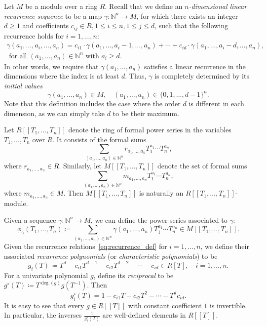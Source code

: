 \documentclass[letterpaper, 11pt, thm-restate]{article}
\numberwithin{equation}{section}
\newcommand{\N}{\mathbb{N}}
\theoremstyle{definition}
\theoremstyle{definition}
\theoremstyle{definition}
\begin{document}
Let $M$ be a module over a ring $R$.
Recall that we define an \emph{$n$-dimensional linear recurrence sequence} to be a map $\gamma \colon \N^n \rightarrow M$, for which there exists an integer $d \geq 1$ and coefficients $c_{ij} \in R, 1 \leq i \leq n, 1 \leq j \leq d$, such that the following recurrence holds for $i = 1, \ldots, n$:
\begin{align}\label{eq:recurrence_def}
\gamma(a_1, \ldots, a_i, \ldots, a_n) = c_{i1} \cdot \gamma(a_1, \ldots, a_i-1, \ldots, a_n) + \cdots + c_{id} \cdot \gamma(a_1, \ldots, a_i-d, \ldots, a_n), \quad & \\
\text{ for all $(a_1, \ldots, a_n) \in \N^n$ with $a_i\geq d$}.& \nonumber
\end{align}
In other words, we require that $\gamma(a_1, \ldots, a_n)$ satisfies a linear recurrence in the dimensions where the index is at least $d$.
Thus, $\gamma$ is completely determined by its \emph{initial values}
\[
\gamma(a_1, \ldots, a_n) \in M, \quad (a_1, \ldots, a_n) \in \{0, 1, \ldots, d-1\}^n.
\]
Note that this definition includes the case where the order $d$ is different in each dimension, as we can simply take $d$ to be their maximum.

Let $R[[T_1,\ldots,T_n]]$ denote the ring of formal power series in the variables $T_1, \ldots, T_n$ over $R$.
It consists of the formal sums
\[
\sum_{(a_1, \ldots, a_n) \in \N^n} r_{a_1, \ldots, a_n} T_1^{a_1} \cdots T_n^{a_n},
\]
where $r_{a_1, \ldots, a_n} \in R$.
Similarly, let $M[[T_1,\ldots,T_n]]$ denote the set of formal sums
\[
\sum_{(a_1, \ldots, a_n) \in \N^n} m_{a_1, \ldots, a_n} T_1^{a_1} \cdots T_n^{a_n},
\]
where $m_{a_1, \ldots, a_n} \in M$. 
Then $M[[T_1,\ldots,T_n]]$ is naturally an $R[[T_1,\ldots,T_n]]$-module.

Given a sequence $\gamma \colon \N^n \rightarrow M$, we can define the power series associated to $\gamma$:
\[
\phi_{\gamma}(T_1, \ldots, T_n) \coloneqq \sum_{(a_1, \ldots, a_n) \in \N^n} \gamma(a_1, \ldots, a_n) T_1^{a_1} \cdots T_n^{a_n} \in M[[T_1, \ldots, T_n]].
\]
Given the recurrence relations~\eqref{eq:recurrence_def} for $i = 1, \ldots, n$, we define their associated \emph{recurrence polynomials} (or \emph{characteristic polynomials}) to be
\[
g_i(T) \coloneqq T^{d} - c_{i1} T^{d-1} - c_{i2} T^{d-2} - \cdots - c_{id} \in R[T], \quad i = 1, \ldots, n.
\]
For a univariate polynomial $g$, define its \emph{reciprocal} to be $g^\circ(T) \coloneqq T^{\deg(g)}g(T^{-1})$.
Then
\begin{equation}\label{eq:gi_circ}
g_i^\circ(T) = 1 - c_{i1} T - c_{i2} T^{2} - \cdots - T^{d} c_{id}.
\end{equation}
It is easy to see that every $g \in R[[T]]$ with constant coefficient $1$ is invertible.
In particular, the inverses $\frac{1}{g_i^\circ(T)}$ are well-defined elements in $R[[T]]$.
\end{document}
